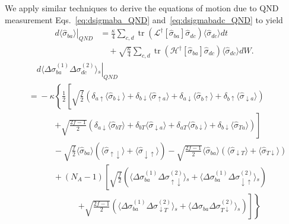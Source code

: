 \documentclass[aps,pra,twocolumn,superscriptaddress]{revtex4-1} %
\DeclareMathOperator{\tr}{tr}
\newcommand{\nn}{\nonumber}
\newcommand{\expect}[1]{\big\langle #1 \big\rangle}
\begin{document}
\begin{appendix}
We apply similar techniques to derive the equations of motion due to QND measurement Eqs.~\eqref{eq:dsigmaba_QND} and~\eqref{eq:dsigmabadc_QND} to yield
\begin{align}\label{eq:dsigmaba_QND_expand}
\left.d\expect{\!\hat{\sigma}_{ba}\!}\right|_{QN\!D} &=\frac{\kappa}{4}\sum_{c,d}\tr\left(\mathcal{L}^\dagger\left[\hat{\sigma}_{ba} \right]\hat{\sigma}_{dc}\right) \expect{\hat{\sigma}_{dc}}dt \nn\\
&\quad +\!\! \sqrt{\frac{\kappa}{4}}\!\sum_{c,d}\!\tr\left(\mathcal{H}^\dagger\!\left[\hat{\sigma}_{ba} \right]\!\hat{\sigma}_{dc}\right)\! \expect{\!\hat{\sigma}_{dc}\!}dW .
\end{align}
\begin{align}
&\quad\left.d\expect{\!\Delta \sigma_{ba}^{(\!1\!)}\! \Delta \sigma_{dc}^{(\!2\!)}}\!_s \right|_{QN\!D} \nn\\
&=\!\! -\kappa\!\left\{\!\frac{1}{2}\!\left[ \sqrt{\frac{f}{2}}\!\left(\delta_{a\uparrow}\expect{\!\hat{\sigma}_{b\downarrow}\!}\!+\! \delta_{b\downarrow}\expect{\!\hat{\sigma}_{\uparrow a}\!}\!+\!\delta_{a\downarrow}\expect{\!\hat{\sigma}_{b\uparrow}\!} \!+\!\delta_{b\uparrow}\expect{\!\hat{\sigma}_{\downarrow a}\! } \right)\right.\right.\nn\\
&\quad\quad\,\quad\left. +\sqrt{\frac{2f\!-\!1}{2}}\!\left(\delta_{a\downarrow}\! \expect{\!\hat{\sigma}_{bT}\!} \!\!+\! \delta_{bT}\expect{\!\hat{\sigma}_{\downarrow a}\! } \!\!+\!\delta_{aT}\expect{\!\hat{\sigma}_{b\downarrow}\! } \!\!+\!\delta_{b\downarrow}\!\expect{\!\hat{\sigma}_{Ta}\! } \!\right)\!\right] \nn\\
&\quad\quad\quad -\!\sqrt{\!\frac{f}{2}}\expect{\!\hat{\sigma}_{ba}\! }\!\left(\!\expect{\!\hat{\sigma}_{\uparrow\downarrow}\! }\!\!+\!\expect{\!\hat{\sigma}_{\downarrow\uparrow}\! }\! \right)\! \!-\!\sqrt{\!\frac{2f\!\!-\!\!1}{2}} \expect{\!\hat{\sigma}_{ba}\!}\!\left(\!\expect{\!\hat{\sigma}_{\downarrow T}\!}\!+\!\expect{\!\hat{\sigma}_{T\downarrow}\!}\! \right)\nn\\ &\quad\quad\quad+\!(N_A\!-\!1)\left[\sqrt{\frac{f}{2}}\!\left(\expect{\!\Delta \sigma^{(1)}_{ba}  \Delta\sigma_{\uparrow\downarrow}^{(2)}}\!_s \!+\!\expect{\!\Delta\sigma_{ba}^{(\!1\!)}\Delta\sigma_{\downarrow\uparrow}^{(\!2\!)}}\!_s\right)\right.\nn\\
&\quad\quad\quad\quad\quad\quad\left.\left. + \sqrt{\frac{2f\!-\! 1}{2}}\!\left(\!\expect{\!\Delta \sigma^{(\!1\!)}_{ba}\Delta \sigma_{\downarrow T}^{(\!2\!)}}\!_s \!+\! \expect{\!\Delta\sigma_{ba}\Delta\sigma_{T\downarrow}^{(2)}}\!_s \!\right)\!\right] \! \right\}\nn\\

\end{align}
\end{appendix}
\end{document}

